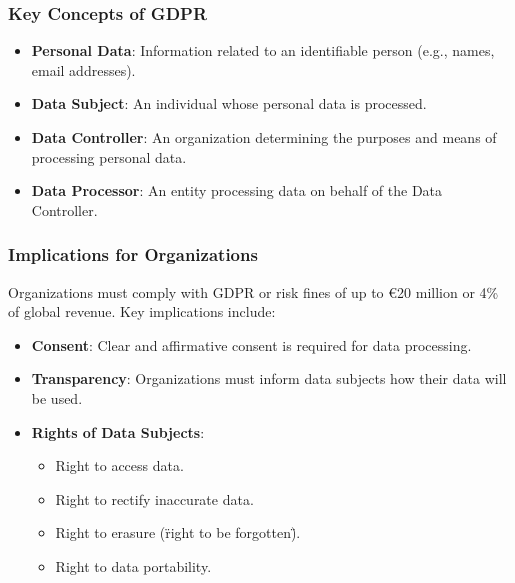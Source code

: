 \documentclass[aspectratio=169]{beamer}
\begin{document}
\begin{frame}[fragile]
    \frametitle{Key Concepts of GDPR}
    \begin{itemize}
        \item \textbf{Personal Data}: Information related to an identifiable person (e.g., names, email addresses).
        \item \textbf{Data Subject}: An individual whose personal data is processed.
        \item \textbf{Data Controller}: An organization determining the purposes and means of processing personal data.
        \item \textbf{Data Processor}: An entity processing data on behalf of the Data Controller.
    \end{itemize}
\end{frame}

\begin{frame}[fragile]
    \frametitle{Implications for Organizations}
    Organizations must comply with GDPR or risk fines of up to €20 million or 4\% of global revenue. Key implications include:
    \begin{itemize}
        \item \textbf{Consent}: Clear and affirmative consent is required for data processing.
        \item \textbf{Transparency}: Organizations must inform data subjects how their data will be used.
        \item \textbf{Rights of Data Subjects}:
        \begin{itemize}
            \item Right to access data.
            \item Right to rectify inaccurate data.
            \item Right to erasure (\"right to be forgotten\").
            \item Right to data portability.
        \end{itemize}
    \end{itemize}
\end{frame}
\end{document}
